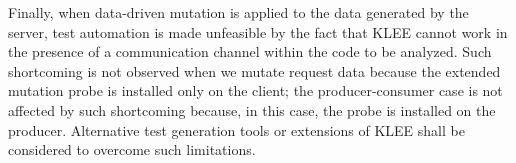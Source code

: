 Finally, when data-driven mutation is applied to the data generated by the server, test automation is made unfeasible by the fact that KLEE cannot work in the presence of a communication channel within the code to be analyzed. Such shortcoming is not observed when we mutate request data because the extended mutation probe is installed only on the client; the producer-consumer case is not affected by such shortcoming because, in this case, the probe is installed on the producer. Alternative test generation tools or extensions of KLEE shall be considered to overcome such limitations.







\ENDCHANGEDWPT




